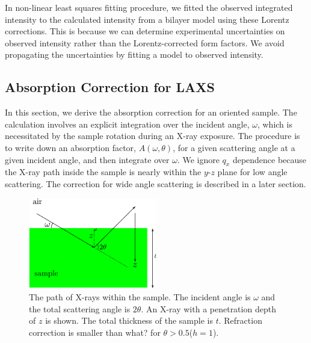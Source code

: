 In non-linear least squares fitting procedure, 
we fitted the observed integrated intensity to
the calculated intensity from a bilayer model using these Lorentz corrections. 
This is because we can determine experimental uncertainties
on observed intensity rather than the Lorentz-corrected form factors. 
We avoid propagating the uncertainties by fitting a model to observed intensity. 

\subsection{Absorption Correction for LAXS}\label{sec:abs_correction_LAXS}
In this section, we derive the absorption correction for an oriented sample. 
The calculation involves an explicit integration over the incident angle, 
$\omega$, which is necessitated by the sample rotation during an X-ray exposure. 
The procedure is to write down an absorption factor, $A(\omega,\theta)$, for a 
given scattering angle at a given incident angle, and
then integrate over $\omega$. We ignore $q_x$ dependence because the X-ray
path inside the sample is nearly within the $y$-$z$ plane for low angle
scattering. The correction for wide angle scattering is described in a later
section.

\begin{figure}[htbp]
  \centering
  \includegraphics[width=0.5\textwidth]{figures/ripple/analysis/absorption_LAXS}
  \caption{The path of X-rays within the sample. The incident angle is 
  $\omega$ and the total scattering angle is $2\theta$. An X-ray with a
  penetration depth of $z$ is shown. The total thickness of the sample
  is $t$. Refraction correction is smaller than {\color{red} what?} for 
  $\theta > 0.5$\textdegree ($h=1$).}
  \label{fig:absorption_LAXS}
\end{figure}

